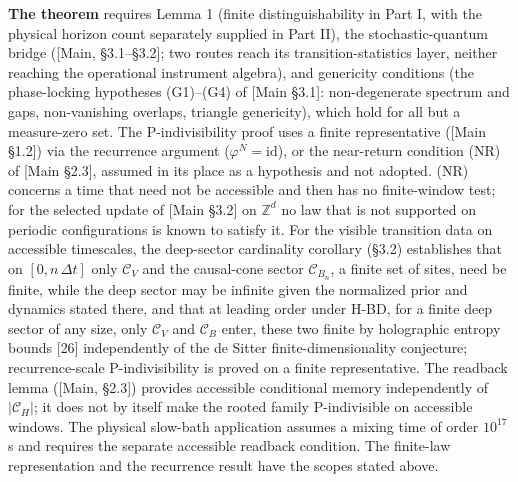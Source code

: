 \documentclass[
]{article}
\begin{document}
\textbf{The theorem} requires Lemma 1 (finite distinguishability in Part
I, with the physical horizon count separately supplied in Part II), the
stochastic-quantum bridge ({[}Main, §3.1--§3.2{]}; two routes reach its
transition-statistics layer, neither reaching the operational instrument
algebra), and genericity conditions (the phase-locking hypotheses
(G1)--(G4) of {[}Main §3.1{]}: non-degenerate spectrum and gaps,
non-vanishing overlaps, triangle genericity), which hold for all but a
measure-zero set. The P-indivisibility proof uses a finite
representative ({[}Main §1.2{]}) via the recurrence argument
(\(\varphi^N = \text{id}\)), or the near-return condition (NR) of
{[}Main §2.3{]}, assumed in its place as a hypothesis and not adopted.
(NR) concerns a time that need not be accessible and then has no
finite-window test; for the selected update of {[}Main §3.2{]} on
\(\mathbb{Z}^d\) no law that is not supported on periodic configurations
is known to satisfy it. For the visible transition data on accessible
timescales, the deep-sector cardinality corollary (§3.2) establishes
that on \([0, n\,\Delta t]\) only \(\mathcal{C}_V\) and the causal-cone
sector \(\mathcal{C}_{B_n}\), a finite set of sites, need be finite,
while the deep sector may be infinite given the normalized prior and
dynamics stated there, and that at leading order under H-BD, for a
finite deep sector of any size, only \(\mathcal{C}_V\) and
\(\mathcal{C}_B\) enter, these two finite by holographic entropy bounds
{[}26{]} independently of the de Sitter finite-dimensionality
conjecture; recurrence-scale P-indivisibility is proved on a finite
representative. The readback lemma ({[}Main, §2.3{]}) provides
accessible conditional memory independently of \(|\mathcal{C}_H|\); it
does not by itself make the rooted family P-indivisible on accessible
windows. The physical slow-bath application assumes a mixing time of
order \(10^{17}\) s and requires the separate accessible readback
condition. The finite-law representation and the recurrence result have
the scopes stated above.
\end{document}
